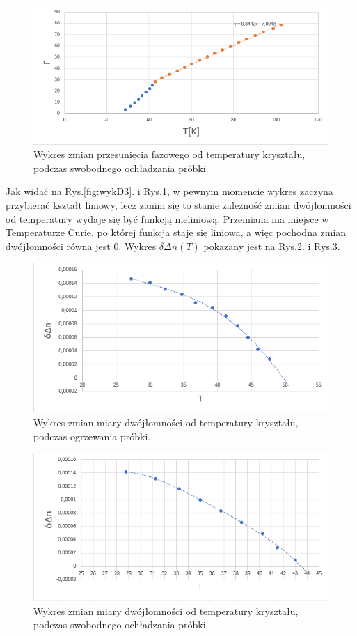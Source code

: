 \documentclass{article}
\begin{document}
\begin{figure}[!h]
	\centering
	\includegraphics[width=0.7\linewidth]{wykD4.png}
	\caption{Wykres zmian przesunięcia fazowego od temperatury kryształu, podczas swobodnego ochładzania próbki.}
	\label{fig:wykD4}
\end{figure}

Jak widać na Rys.\ref{fig:wykD3}. i Rys.\ref{fig:wykD4}, w pewnym momencie wykres zaczyna przybierać kształt liniowy, lecz zanim się to stanie zależność zmian dwójłomności od temperatury wydaje się być funkcją nieliniową. Przemiana ma miejsce w Temperaturze Curie, po której funkcja staje się liniowa, a więc pochodna zmian dwójłomności równa jest 0. Wykres $\delta \Delta n(T)$ pokazany jest na Rys.\ref{fig:wykD5}. i Rys.\ref{fig:wykD6}.

\begin{figure}[!h]
	\centering
	\includegraphics[width=0.7\linewidth]{wykD5.png}
	\caption{Wykres zmian miary dwójłomności od temperatury kryształu, podczas ogrzewania próbki.}
	\label{fig:wykD5}
\end{figure}

\begin{figure}[!h]
	\centering
	\includegraphics[width=0.7\linewidth]{wykD6.png}
	\caption{Wykres zmian miary dwójłomności od temperatury kryształu, podczas swobodnego ochładzania próbki.}
	\label{fig:wykD6}
\end{figure}
\end{document}
